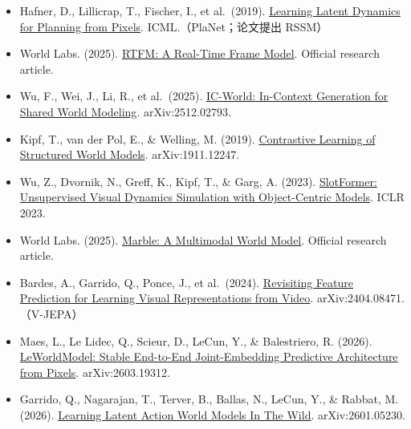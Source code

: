 \vspace{0.25em}
\begin{itemize}
\tightlist
\item
  Hafner, D., Lillicrap, T., Fischer, I., et al.~(2019). \href{https://arxiv.org/abs/1811.04551}{Learning Latent Dynamics for Planning from Pixels}. ICML.（PlaNet；论文提出 RSSM）
\item
  World Labs. (2025). \href{https://www.worldlabs.ai/blog/rtfm}{RTFM: A Real-Time Frame Model}. Official research article.
\item
  Wu, F., Wei, J., Li, R., et al.~(2025). \href{https://arxiv.org/abs/2512.02793}{IC-World: In-Context Generation for Shared World Modeling}. arXiv:2512.02793.
\item
  Kipf, T., van der Pol, E., \& Welling, M. (2019). \href{https://arxiv.org/abs/1911.12247}{Contrastive Learning of Structured World Models}. arXiv:1911.12247.
\item
  Wu, Z., Dvornik, N., Greff, K., Kipf, T., \& Garg, A. (2023). \href{https://arxiv.org/abs/2210.05861}{SlotFormer: Unsupervised Visual Dynamics Simulation with Object-Centric Models}. ICLR 2023.
\item
  World Labs. (2025). \href{https://www.worldlabs.ai/blog/marble-world-model}{Marble: A Multimodal World Model}. Official research article.
\item
  Bardes, A., Garrido, Q., Ponce, J., et al.~(2024). \href{https://arxiv.org/abs/2404.08471}{Revisiting Feature Prediction for Learning Visual Representations from Video}. arXiv:2404.08471.（V-JEPA）
\item
  Maes, L., Le Lidec, Q., Scieur, D., LeCun, Y., \& Balestriero, R. (2026). \href{https://arxiv.org/abs/2603.19312}{LeWorldModel: Stable End-to-End Joint-Embedding Predictive Architecture from Pixels}. arXiv:2603.19312.
\item
  Garrido, Q., Nagarajan, T., Terver, B., Ballas, N., LeCun, Y., \& Rabbat, M. (2026). \href{https://arxiv.org/abs/2601.05230}{Learning Latent Action World Models In The Wild}. arXiv:2601.05230.
\end{itemize}

\clearpage
